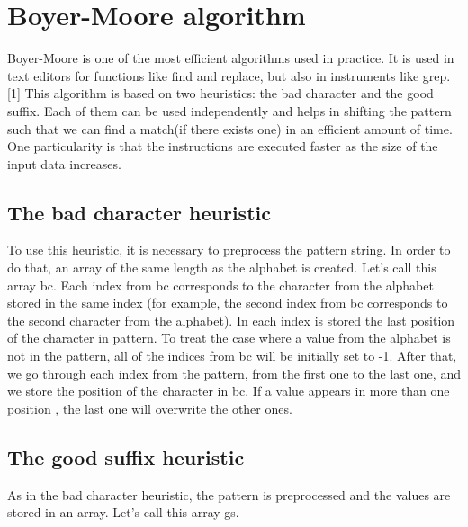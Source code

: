 \chapter{Boyer-Moore algorithm}

Boyer-Moore is one of the most efficient algorithms used in practice. It is used in text editors for functions like find and replace, but also in instruments like grep.[1]
This algorithm is based on two heuristics: the bad character and the good suffix. Each of them can be used independently and helps in shifting the pattern such that we can find a match(if there exists one) in an efficient amount of time. One particularity is that the instructions are executed faster as the size of the input data increases. 

\section{The bad character heuristic}

To use this heuristic, it is necessary to preprocess the pattern string. In order to do that, an array of the same length as the alphabet is created. Let's call this array bc. Each index from bc corresponds to the character from the alphabet stored in the same index (for example, the second index from bc corresponds to the second character from the alphabet). In each index is stored the last position of the character in pattern. To treat the case where a value from the alphabet is not in the pattern, all of the indices from bc will be initially set to -1. After that, we go through each index from the pattern, from the first one to the last one, and we store the position of the character in bc. If a value appears in more than one position , the last one will overwrite the other ones.

\section{The good suffix heuristic}

As in the bad character heuristic, the pattern is preprocessed and the values are stored in an array. Let's call this array gs. 